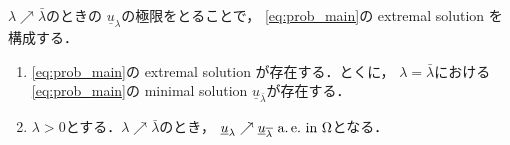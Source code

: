 $\lambda \nearrow \bar{\lambda}$のときの
$\underline{u}_\lambda$の極限をとることで，
\ref{eq:prob_main}の extremal solution を構成する．

\begin{prop} \label{prop:ext_exi}
 \begin{enumerate}[1.] \sage
  \item \ref{eq:prob_main}の extremal solution が存在する．とくに，
        $\lambda = \bar{\lambda}$における\ref{eq:prob_main}の
        minimal solution $\underline{u}_{\bar{\lambda}}$が存在する．
  \item $\lambda > 0$とする．$\lambda \nearrow \bar{\lambda}$のとき，
        $\underline{u}_\lambda \nearrow
        \underline{u}_{\overline{\lambda}} ~\text{a.\,e.}~
        \text{in}~
        \Omega$となる．
 \end{enumerate}
\end{prop}

